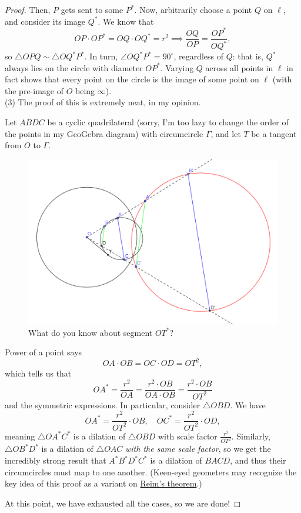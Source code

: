 \documentclass{scrartcl}
\providecommand{\dg}{^\circ}
\begin{document}
\begin{proof}
Then, $P$ gets sent to some $P^\ast $.
Now, arbitrarily choose a point $Q$ on $\ell$, and consider its image $Q^\ast $.
We know that
\[OP\cdot OP^\ast  = OQ\cdot OQ^\ast  = r^2\implies \frac{OQ}{OP} = \frac{OP^\ast }{OQ^\ast },\]
so $\triangle OPQ\sim\triangle OQ^\ast P^\ast $. In turn,
$\angle OQ^\ast P^\ast  = 90\dg$, regardless of $Q$: that is, $Q^\ast $ always lies on
the circle with diameter $OP^\ast $. Varying $Q$ across all points in $\ell$
in fact shows that every point on the circle is the image of
some point on $\ell$ (with the pre-image of $O$ being $\infty$).
\\

(3) The proof of this is extremely neat, in my opinion.

Let $ABDC$ be a cyclic quadrilateral
(sorry, I'm too lazy to change the order of the points in my GeoGebra diagram)
with circumcircle $\Gamma$,
and let $T$ be a tangent from $O$ to $\Gamma$. 

\begin{figure}[h]
	\centering
	\includegraphics[width=0.75\linewidth]{inversion_circleToCircle}
	\caption{What do you know about segment $OT^\ast$?}
	\label{fig:inversioncircletocircle}
\end{figure}

Power of a point says
\[OA\cdot OB = OC\cdot OD = OT^2,\]
which tells us that
\[OA^\ast  = \frac{r^2}{OA} = \frac{r^2\cdot OB}{OA\cdot OB} =
\frac{r^2\cdot OB}{OT^2}\]
and the symmetric expressions. In particular, consider
$\triangle OBD$. We have
\[OA^\ast  = \frac{r^2}{OT^2}\cdot OB,\quad OC^\ast  = \frac{r^2}{OT^2}\cdot OD,\]
meaning $\triangle OA^\ast C^\ast $ is a dilation of $\triangle OBD$ with scale factor
$\frac{r^2}{OT^2}$. Similarly, $\triangle OB^\ast D^\ast $ is a dilation of
$\triangle OAC$ \emph{with the same scale factor}, so we get
the incredibly strong result that $A^\ast B^\ast D^\ast C^\ast $ is a dilation of $BACD$,
and thus their circumcircles must map to one another.
(Keen-eyed geometers may recognize the key idea of this proof as a variant on
\href{https://pleasantonmathcircle.org/assets/mat/CyclicQuad.pdf#page=3}
{Reim's theorem}.)

\noindent At this point, we have exhausted all the cases, so we are done!
\end{proof}
\end{document}
